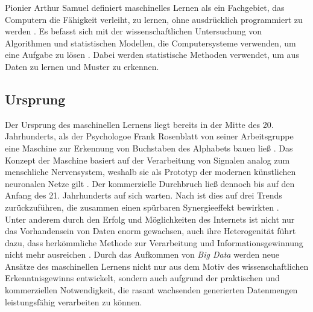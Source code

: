 \documentclass[german,bachelor]{swsLeipzig}
\begin{document}
Pionier Arthur Samuel definiert maschinelles Lernen als ein Fachgebiet, das Computern die Fähigkeit verleiht, zu lernen,
ohne ausdrücklich programmiert zu werden \cite[S. 381]{mahesh2020machine}.
Es befasst sich mit der wissenschaftlichen Untersuchung von Algorithmen und statistischen Modellen,
die Computersysteme verwenden, um eine Aufgabe zu lösen \cite[S. 381]{mahesh2020machine}.
Dabei werden statistische Methoden verwendet, um aus Daten zu lernen und Muster zu erkennen. \\


\subsection{Ursprung}
Der Ursprung des maschinellen Lernens liegt bereits in der Mitte des 20. Jahrhunderts, als der Psychologoe Frank Rosenblatt
von seiner Arbeitsgruppe eine Maschine zur Erkennung von Buchstaben des Alphabets bauen ließ \cite[S. 1385]{FRADKOV20201385}.
Das Konzept der Maschine basiert auf der Verarbeitung von Signalen analog zum menschliche Nervensystem, weshalb sie
als Prototyp der modernen künstlichen neuronalen Netze gilt \cite[S. 1385]{FRADKOV20201385}.
Der kommerzielle Durchbruch ließ dennoch bis auf den Anfang des 21. Jahrhunderts auf sich warten.
Nach \citeauthor{FRADKOV20201385} ist dies auf drei Trends zurückzuführen, die zusammen einen spürbaren Synergieeffekt bewirkten \cite[S. 1387]{FRADKOV20201385}. \\

Unter anderem durch den Erfolg und Möglichkeiten des Internets ist nicht nur das Vorhandensein von Daten enorm gewachsen,
auch ihre Heterogenität führt dazu, dass herkömmliche Methode zur Verarbeitung und Informationsgewinnung nicht mehr ausreichen \cite[S. 1387]{FRADKOV20201385}.
Durch das Aufkommen von \textit{Big Data} werden neue Ansätze des maschinellen Lernens nicht nur aus dem Motiv des wissenschaftlichen Erkenntnisgewinns entwickelt,
sondern auch aufgrund der praktischen und kommerziellen Notwendigkeit, die rasant wachsenden generierten Datenmengen leistungsfähig verarbeiten zu können. \\
\end{document}
